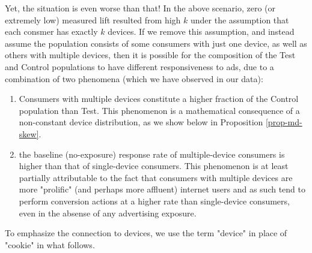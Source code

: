\documentclass[11pt,a4paper]{article}
\theoremstyle{definition}
\theoremstyle{remark}
\theoremstyle{definition}
\theoremstyle{definition}
\theoremstyle{definition}
\theoremstyle{definition}
\theoremstyle{definition}
\theoremstyle{definition}
\begin{document}
Yet, the situation is even worse than that! In the above scenario, zero (or extremely low) measured lift resulted from high $k$ under the assumption that each consmer has exactly $k$ devices. If we remove this assumption, and instead assume the population consists of some consumers with just one device, as well as others with multiple devices, then it is possible for the composition of the Test and Control populations to have different responsiveness to ads, due to a combination of two phenomena (which we have observed in our data):
\begin{enumerate}
\item Consumers with multiple devices constitute a higher fraction of the Control population than Test. This phenomenon is a mathematical consequence of a non-constant device distribution, as we show below in Proposition \ref{prop-md-skew}.
\item the baseline (no-exposure) response rate of multiple-device consumers is higher than that of single-device consumers. This phenomenon is at least partially attributable to the fact that consumers with multiple devices are more "prolific" (and perhaps more affluent) internet users and as such tend to perform conversion actions at a higher rate than single-device consumers, even in the absense of any advertising exposure.
\end{enumerate}


To emphasize the connection to devices, we use the term "device" in place of "cookie" in what follows.
\end{document}
